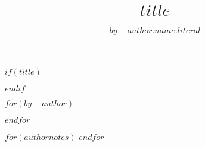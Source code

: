 $if(title)$
\title{$title$}
$endif$

$for(by-author)$
  \author[$for(it.affiliations/first)$$it.name$$endfor$]{$by-author.name.literal$}
$endfor$

$for(authornotes)$
$endfor$
